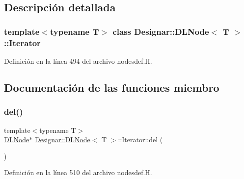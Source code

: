\subsection{Descripción detallada}
\subsubsection*{template$<$typename T$>$\newline
class Designar\+::\+D\+L\+Node$<$ T $>$\+::\+Iterator}



Definición en la línea 494 del archivo nodesdef.\+H.



\subsection{Documentación de las funciones miembro}
\mbox{\label{class_designar_1_1_d_l_node_1_1_iterator_a7ba9818dbd9d8cbbd85fe47db3395375}} 
\subsubsection{\texorpdfstring{del()}{del()}}
{\footnotesize\ttfamily template$<$typename T$>$ \\
\hyperlink{class_designar_1_1_d_l_node}{D\+L\+Node}$\ast$ \hyperlink{class_designar_1_1_d_l_node}{Designar\+::\+D\+L\+Node}$<$ T $>$\+::Iterator\+::del (\begin{DoxyParamCaption}{ }\end{DoxyParamCaption})\hspace{0.3cm}{\ttfamily [inline]}}



Definición en la línea 510 del archivo nodesdef.\+H.

\mbox{\label{class_designar_1_1_d_l_node_1_1_iterator_a5787051e4f6727efef70ac3f8991ab59}} 
